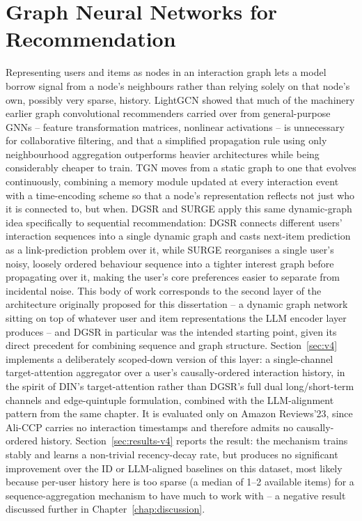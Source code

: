 \documentclass{uclthesis}
\begin{document}
\section{Graph Neural Networks for Recommendation}
Representing users and items as nodes in an interaction graph lets a model borrow signal from a node's neighbours rather than relying solely on that node's own, possibly very sparse, history. LightGCN \citep{he2020lightgcn} showed that much of the machinery earlier graph convolutional recommenders carried over from general-purpose GNNs -- feature transformation matrices, nonlinear activations -- is unnecessary for collaborative filtering, and that a simplified propagation rule using only neighbourhood aggregation outperforms heavier architectures while being considerably cheaper to train. TGN \citep{rossi2020tgn} moves from a static graph to one that evolves continuously, combining a memory module updated at every interaction event with a time-encoding scheme so that a node's representation reflects not just who it is connected to, but when. DGSR \citep{zhang2022dgsr} and SURGE \citep{chang2021surge} apply this same dynamic-graph idea specifically to sequential recommendation: DGSR connects different users' interaction sequences into a single dynamic graph and casts next-item prediction as a link-prediction problem over it, while SURGE reorganises a single user's noisy, loosely ordered behaviour sequence into a tighter interest graph before propagating over it, making the user's core preferences easier to separate from incidental noise.
This body of work corresponds to the second layer of the architecture originally proposed for this dissertation -- a dynamic graph network sitting on top of whatever user and item representations the LLM encoder layer produces -- and DGSR \citep{zhang2022dgsr} in particular was the intended starting point, given its direct precedent for combining sequence and graph structure. Section~\ref{sec:v4} implements a deliberately scoped-down version of this layer: a single-channel target-attention aggregator over a user's causally-ordered interaction history, in the spirit of DIN's \citep{zhou2018din} target-attention rather than DGSR's full dual long/short-term channels and edge-quintuple formulation, combined with the LLM-alignment pattern from the same chapter. It is evaluated only on Amazon Reviews'23, since Ali-CCP carries no interaction timestamps and therefore admits no causally-ordered history. Section~\ref{sec:results-v4} reports the result: the mechanism trains stably and learns a non-trivial recency-decay rate, but produces no significant improvement over the ID or LLM-aligned baselines on this dataset, most likely because per-user history here is too sparse (a median of 1--2 available items) for a sequence-aggregation mechanism to have much to work with -- a negative result discussed further in Chapter~\ref{chap:discussion}.
\end{document}
